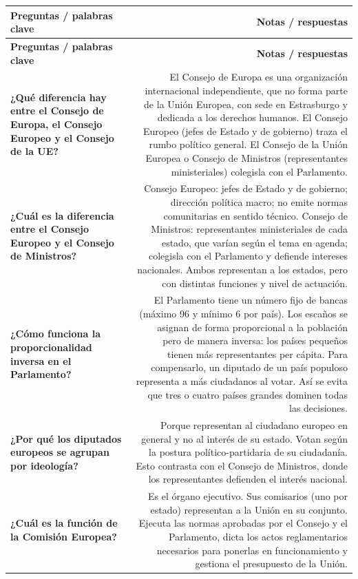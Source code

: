 \documentclass[12pt,oneside]{book}
\begin{document}
\begin{longtable}{@{}QN@{}}
\toprule
\textbf{Preguntas / palabras clave} & \textbf{Notas / respuestas} \\
\midrule
\endfirsthead
\toprule
\textbf{Preguntas / palabras clave} & \textbf{Notas / respuestas} \\
\midrule
\endhead

\textbf{¿Qué diferencia hay entre el Consejo de Europa, el Consejo Europeo y el Consejo de la UE?} &
El Consejo de Europa es una organización internacional independiente, que no forma parte de la Unión Europea, con sede en Estrasburgo y dedicada a los derechos humanos. El Consejo Europeo (jefes de Estado y de gobierno) traza el rumbo político general. El Consejo de la Unión Europea o Consejo de Ministros (representantes ministeriales) colegisla con el Parlamento. \\[0.8em]

\textbf{¿Cuál es la diferencia entre el Consejo Europeo y el Consejo de Ministros?} &
Consejo Europeo: jefes de Estado y de gobierno; dirección política macro; no emite normas comunitarias en sentido técnico. Consejo de Ministros: representantes ministeriales de cada estado, que varían según el tema en agenda; colegisla con el Parlamento y defiende intereses nacionales. Ambos representan a los estados, pero con distintas funciones y nivel de actuación. \\[0.8em]

\textbf{¿Cómo funciona la proporcionalidad inversa en el Parlamento?} &
El Parlamento tiene un número fijo de bancas (máximo 96 y mínimo 6 por país). Los escaños se asignan de forma proporcional a la población pero de manera inversa: los países pequeños tienen más representantes per cápita. Para compensarlo, un diputado de un país populoso representa a más ciudadanos al votar. Así se evita que tres o cuatro países grandes dominen todas las decisiones. \\[0.8em]

\textbf{¿Por qué los diputados europeos se agrupan por ideología?} &
Porque representan al ciudadano europeo en general y no al interés de su estado. Votan según la postura político-partidaria de su ciudadanía. Esto contrasta con el Consejo de Ministros, donde los representantes defienden el interés nacional. \\[0.8em]

\textbf{¿Cuál es la función de la Comisión Europea?} &
Es el órgano ejecutivo. Sus comisarios (uno por estado) representan a la Unión en su conjunto. Ejecuta las normas aprobadas por el Consejo y el Parlamento, dicta los actos reglamentarios necesarios para ponerlas en funcionamiento y gestiona el presupuesto de la Unión. \\[0.8em]


\end{longtable}
\end{document}
